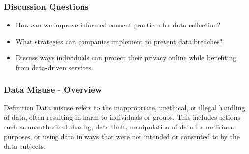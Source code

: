 \documentclass[aspectratio=169]{beamer}
\begin{document}
\begin{frame}[fragile]
    \frametitle{Discussion Questions}
    \begin{itemize}
        \item How can we improve informed consent practices for data collection?
        \item What strategies can companies implement to prevent data breaches?
        \item Discuss ways individuals can protect their privacy online while benefiting from data-driven services.
    \end{itemize}
\end{frame}

\begin{frame}[fragile]
    \frametitle{Data Misuse - Overview}
    \begin{block}{Definition}
        Data misuse refers to the inappropriate, unethical, or illegal handling of data, often resulting in harm to individuals or groups. This includes actions such as unauthorized sharing, data theft, manipulation of data for malicious purposes, or using data in ways that were not intended or consented to by the data subjects.
    \end{block}
\end{frame}
\end{document}
